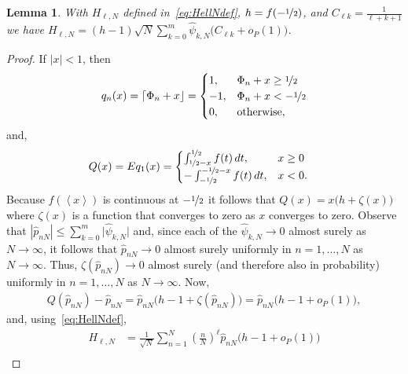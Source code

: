 \documentclass[aap]{imsart}
\newcommand{\fracpart}[1]{\left\langle #1 \right\rangle}
\newcommand{\abs}[1]{\left\vert #1 \right\vert}
\newcommand{\sabs}[1]{\vert #1 \vert}
\newcommand{\round}[1]{{\left\lceil #1 \right\rfloor}}
\newtheorem{lemma}{Lemma}
\begin{document}
\begin{lemma}\label{lem:sumpNhilb}
With $H_{\ell,N}$ defined in~\eqref{eq:HellNdef}, $h = f(-\nicefrac{1}{2})$, and  $C_{\ell k} = \tfrac{1}{\ell + k + 1}$ we have $H_{\ell,N} = (h-1)\sqrt{N} \sum_{k=0}^{m}  \widehat{\psi}_{k,N} \big(C_{\ell k} + o_P(1)\big)$.
\end{lemma}
\begin{proof}
If $\abs{x} < 1$, then
\[
q_n(x)  = \round{\Phi_n + x} = \begin{cases}
1, & \Phi_n + x  \geq \nicefrac{1}{2} \\
-1, & \Phi_n + x  < -\nicefrac{1}{2} \\
0, & \text{otherwise},
\end{cases}
\]
and,
\begin{align*}
Q(x) = Eq_1(x) &=  \begin{cases}
\int_{\nicefrac{1}{2} -x }^{\nicefrac{1}{2}}f(t)\,dt, &   x \geq 0 \\
-\int_{-\nicefrac{1}{2}}^{-\nicefrac{1}{2} - x }f(t)\,dt, &  x  < 0.
\end{cases} 
\end{align*}
Because $f(\fracpart{x})$ is continuous at $-\nicefrac{1}{2}$ it follows that $Q(x) = x \big( h + \zeta(x) \big)$
where $\zeta(x)$ is a function that converges to zero as $x$ converges to zero.  
Observe that $\abs{\widehat{p}_{nN}} \leq \sum_{k=0}^m\sabs{ \widehat{\psi}_{k,N}}$ and, since each of the $\widehat{\psi}_{k,N} \rightarrow 0$ almost surely as $N\rightarrow\infty$, it follows that $\widehat{p}_{nN} \rightarrow 0$ almost surely uniformly in $n = 1, \dots, N$ as $N\rightarrow\infty$.  Thus, $\zeta(\widehat{p}_{nN}) \rightarrow 0$ almost surely (and therefore also in probability) uniformly in $n = 1, \dots, N$ as $N\rightarrow\infty$.  Now,
\begin{align*}
Q(\widehat{p}_{nN}) - \widehat{p}_{nN} = \widehat{p}_{nN}\big( h - 1 + \zeta(\widehat{p}_{nN}) \big) = \widehat{p}_{nN}\big( h - 1 + o_P(1) \big), 
\end{align*}
and, using~\eqref{eq:HellNdef},
\begin{align*}
H_{\ell,N} &= \frac{1}{\sqrt{N}}\sum_{n=1}^{N}(\tfrac{n}{N})^\ell \widehat{p}_{nN}\big( h - 1 + o_P(1) \big)  \\

\end{align*}
\end{proof}
\end{document}
